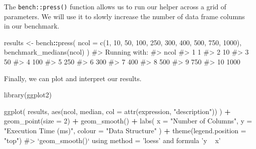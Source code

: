 \documentclass[
]{krantz}
\makeatletter
\newenvironment{Shaded}{\begin{snugshade}}{\end{snugshade}}
\newcommand{\CommentTok}[1]{\textcolor[rgb]{0.56,0.35,0.01}{\textit{#1}}}
\newcommand{\DataTypeTok}[1]{\textcolor[rgb]{0.13,0.29,0.53}{#1}}
\newcommand{\DecValTok}[1]{\textcolor[rgb]{0.00,0.00,0.81}{#1}}
\newcommand{\KeywordTok}[1]{\textcolor[rgb]{0.13,0.29,0.53}{\textbf{#1}}}
\newcommand{\NormalTok}[1]{#1}
\newcommand{\OperatorTok}[1]{\textcolor[rgb]{0.81,0.36,0.00}{\textbf{#1}}}
\newcommand{\StringTok}[1]{\textcolor[rgb]{0.31,0.60,0.02}{#1}}
\newenvironment{kframe}{%
\medskip{}
\setlength{\fboxsep}{.8em}
 \def\at@end@of@kframe{}%
 \ifinner\ifhmode%
  \def\at@end@of@kframe{\end{minipage}}%
  \begin{minipage}{\columnwidth}%
 \fi\fi%
 \def\FrameCommand##1{\hskip\@totalleftmargin \hskip-\fboxsep
 \colorbox{shadecolor}{##1}\hskip-\fboxsep
     \hskip-\linewidth \hskip-\@totalleftmargin \hskip\columnwidth}%
 \MakeFramed {\advance\hsize-\width
   \@totalleftmargin\z@ \linewidth\hsize
   \@setminipage}}%
 {\par\unskip\endMakeFramed%
 \at@end@of@kframe}
\renewenvironment{Shaded}{\begin{kframe}}{\end{kframe}}
\renewcommand{\KeywordTok} [1]{\textcolor[rgb]{0.00,0.44,0.13}{{#1}}}
\renewcommand{\DataTypeTok}[1]{\textcolor[rgb]{0.56,0.13,0.00}{{#1}}}
\renewcommand{\DecValTok}  [1]{\textcolor[rgb]{0.25,0.63,0.44}{{#1}}}
\renewcommand{\StringTok}  [1]{\textcolor[rgb]{0.25,0.44,0.63}{{#1}}}
\renewcommand{\CommentTok} [1]{\textcolor[rgb]{0.38,0.63,0.69}{{#1}}}
\renewcommand{\NormalTok}  [1]{{#1}}
\makeatother
\begin{document}
The \texttt{bench::press()} function allows us to run our helper across a grid of parameters. We will use it to slowly increase the number of data frame columns in our benchmark.

\begin{Shaded}
\begin{Highlighting}[]
\NormalTok{results <-}\StringTok{ }\NormalTok{bench}\OperatorTok{::}\KeywordTok{press}\NormalTok{(}
  \DataTypeTok{ncol =} \KeywordTok{c}\NormalTok{(}\DecValTok{1}\NormalTok{, }\DecValTok{10}\NormalTok{, }\DecValTok{50}\NormalTok{, }\DecValTok{100}\NormalTok{, }\DecValTok{250}\NormalTok{, }\DecValTok{300}\NormalTok{, }\DecValTok{400}\NormalTok{, }\DecValTok{500}\NormalTok{, }\DecValTok{750}\NormalTok{, }\DecValTok{1000}\NormalTok{),}
  \KeywordTok{benchmark_medians}\NormalTok{(ncol)}
\NormalTok{)}
\CommentTok{#> Running with:}
\CommentTok{#>     ncol}
\CommentTok{#>  1     1}
\CommentTok{#>  2    10}
\CommentTok{#>  3    50}
\CommentTok{#>  4   100}
\CommentTok{#>  5   250}
\CommentTok{#>  6   300}
\CommentTok{#>  7   400}
\CommentTok{#>  8   500}
\CommentTok{#>  9   750}
\CommentTok{#> 10  1000}
\end{Highlighting}
\end{Shaded}

Finally, we can plot and interpret our results.

\begin{Shaded}
\begin{Highlighting}[]
\KeywordTok{library}\NormalTok{(ggplot2)}

\KeywordTok{ggplot}\NormalTok{(}
\NormalTok{  results,}
  \KeywordTok{aes}\NormalTok{(ncol, median, }\DataTypeTok{col =} \KeywordTok{attr}\NormalTok{(expression, }\StringTok{"description"}\NormalTok{))}
\NormalTok{) }\OperatorTok{+}
\StringTok{  }\KeywordTok{geom_point}\NormalTok{(}\DataTypeTok{size =} \DecValTok{2}\NormalTok{) }\OperatorTok{+}
\StringTok{  }\KeywordTok{geom_smooth}\NormalTok{() }\OperatorTok{+}
\StringTok{  }\KeywordTok{labs}\NormalTok{(}
    \DataTypeTok{x =} \StringTok{"Number of Columns"}\NormalTok{,}
    \DataTypeTok{y =} \StringTok{"Execution Time (ms)"}\NormalTok{,}
    \DataTypeTok{colour =} \StringTok{"Data Structure"}
\NormalTok{  ) }\OperatorTok{+}
\StringTok{  }\KeywordTok{theme}\NormalTok{(}\DataTypeTok{legend.position =} \StringTok{"top"}\NormalTok{)}
\CommentTok{#> `geom_smooth()` using method = 'loess' and formula 'y ~ x'}
\end{Highlighting}
\end{Shaded}
\end{document}
